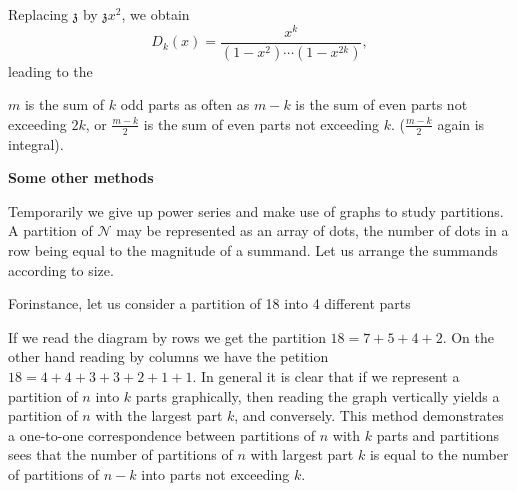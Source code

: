 Replacing $\mathfrak{z}$ by $\mathfrak{z}x^2$, we obtain
$$
D_k (x) = \frac{x^k}{(1-x^2)\cdots (1-x^{2k})},
$$
leading to the 

\begin{thm}\label{part1:lec2:thm5} %
  $m$ is the sum of $k$ odd parts as often as $m-k$ is the sum of even
  parts not exceeding $2k$, or $\frac{m-k}{2}$ is the sum of even
  parts not exceeding $k$. ($\frac{m-k}{2}$ again is integral).
\end{thm}

\noindent \textbf{\large Some other methods}

Temporarily we give up power series and make use of graphs to study
partitions. A partition of $\mathcal{N}$ may be represented as an
array of dots, the number of dots in a row being equal to the
magnitude of a summand. Let us arrange the summands according to size.

For\pageoriginale  instance, let us consider a partition of 18 into 4 different parts

\begin{figure}[H]
\end{figure}

If we read the diagram by rows we get the partition $18=7+5+4+2$. On the
other hand reading by columns we have the petition $18=
4+4+3+3+2+1+1$. In general it is clear that if we represent a partition
of $n$ into $k$ parts graphically, then reading the graph vertically
yields a partition of $n$ with the largest part $k$, and
conversely. This method demonstrates a one-to-one correspondence
between partitions of $n$ with $k$ parts and partitions sees that the
number of partitions of $n$ with largest part $k$ is equal to the
number of partitions of $n-k$ into parts not exceeding $k$.

\begin{figure}[H]
\end{figure}

